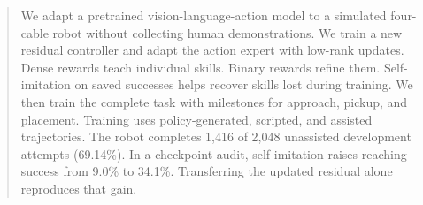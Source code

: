 \begin{abstract}
We adapt a pretrained vision-language-action model to a simulated four-cable robot without collecting human demonstrations. We train a new residual controller and adapt the action expert with low-rank updates. Dense rewards teach individual skills. Binary rewards refine them. Self-imitation on saved successes helps recover skills lost during training. We then train the complete task with milestones for approach, pickup, and placement. Training uses policy-generated, scripted, and assisted trajectories. The robot completes 1,416 of 2,048 unassisted development attempts (69.14\%). In a checkpoint audit, self-imitation raises reaching success from 9.0\% to 34.1\%. Transferring the updated residual alone reproduces that gain.
\end{abstract}
